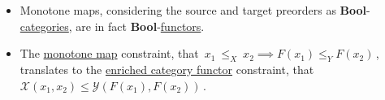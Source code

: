 \begin{itemize}
    \item  Monotone maps, considering the source and target preorders as \textbf{Bool}-\hyperref[D2.46]{categories}, are in fact \textbf{Bool}-\hyperref[D2.69]{functors}.
    \item The \hyperref[D1.59]{monotone map} constraint, that \,$x_1\ \leq_X\ x_2 \implies F(x_1)\leq_Y F(x_2)$\,, translates to the \hyperref[D2.69]{enriched category functor} constraint, that \,$\mathcal{X}(x_1,x_2) \leq \mathcal{Y}(F(x_1),F(x_2))$\,.
  \end{itemize}
